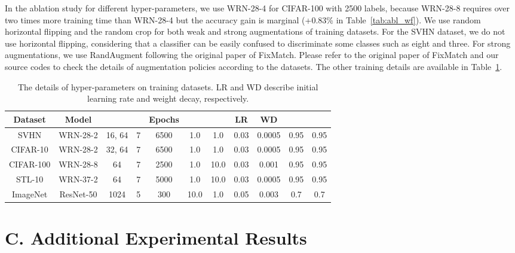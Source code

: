 \documentclass[letterpaper]{article} \usepackage{aaai22}  \usepackage{times}  \usepackage{helvet}  \usepackage{courier}  \usepackage[hyphens]{url}  \usepackage{graphicx} \urlstyle{rm} \def\UrlFont{\rm}  \usepackage{natbib}  \usepackage{caption} \DeclareCaptionStyle{ruled}{labelfont=normalfont,labelsep=colon,strut=off} \frenchspacing  \setlength{\pdfpagewidth}{8.5in}  \setlength{\pdfpageheight}{11in}  \usepackage{algorithm}
\begin{document}
In the ablation study for different hyper-parameters, we use WRN-28-4 for CIFAR-100 with 2500 labels, because WRN-28-8 requires over two times more training time than WRN-28-4 but the accuracy gain is marginal (+0.83\% in Table~\ref{tab:abl_wf}).
We use random horizontal flipping and the random crop for both weak and strong augmentations of training datasets.
For the SVHN dataset, we do not use horizontal flipping, considering that a classifier can be easily confused to discriminate some classes such as eight and three.
For strong augmentations, we use RandAugment \cite{sohn2020fixmatch} following the original paper of FixMatch.
Please refer to the original paper of FixMatch and our source codes to check the details of augmentation policies according to the datasets.
The other training details are available in Table~\ref{tab:abl_setting}.


\begin{table}[]
\centering
\small
\caption{The details of hyper-parameters on training datasets. LR and WD describe initial learning rate and weight decay, respectively.}
\begin{tabular}{c|cccccccccc} \toprule
Dataset   & Model     &   &  & Epochs &  &  & LR & WD &  &  \\ \hline
SVHN      & WRN-28-2  & 16, 64   & 7     & 6500 & 1.0                 & 1.0                 & 0.03          & 0.0005       & 0.95     & 0.95      \\
CIFAR-10  & WRN-28-2  & 32, 64   & 7  & 6500   & 1.0                 & 1.0                 & 0.03          & 0.0005       & 0.95     & 0.95      \\
CIFAR-100 & WRN-28-8  & 64   & 7    & 2500  & 1.0                 & 10.0                & 0.03          & 0.001        & 0.95     & 0.95      \\
STL-10    & WRN-37-2  & 64   & 7 & 5000     & 1.0                 & 10.0                & 0.03          & 0.0005       & 0.95     & 0.95      \\
ImageNet  & ResNet-50 & 1024 & 5  & 300   & 10.0                & 1.0                 & 0.05          & 0.003       & 0.7      & 0.7      \\ \bottomrule
\end{tabular}
\label{tab:abl_setting}
\end{table}

\section{C. Additional Experimental Results}
\end{document}
